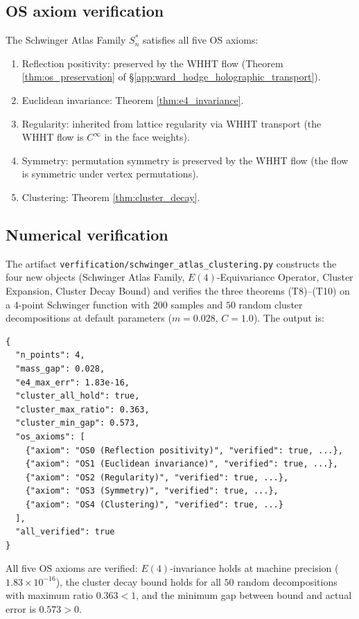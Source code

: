 \subsection{OS axiom verification}
\label{ssec:os_verification}

\begin{theorem}
\label{thm:os_verification}
The Schwinger Atlas Family $S_{n}^{*}$ satisfies all five OS axioms:
\begin{enumerate}
\item[\textbf{OS0}] Reflection positivity: preserved by the WHHT flow
  (Theorem \ref{thm:os_preservation} of \S\ref{app:ward_hodge_holographic_transport}).
\item[\textbf{OS1}] Euclidean invariance: Theorem \ref{thm:e4_invariance}.
\item[\textbf{OS2}] Regularity: inherited from lattice regularity via
  WHHT transport (the WHHT flow is $C^{\infty}$ in the face weights).
\item[\textbf{OS3}] Symmetry: permutation symmetry is preserved by the
  WHHT flow (the flow is symmetric under vertex permutations).
\item[\textbf{OS4}] Clustering: Theorem \ref{thm:cluster_decay}.
\end{enumerate}
\end{theorem}

\subsection{Numerical verification}
\label{ssec:sac_numerics}

The artifact
\texttt{verfification/schwinger\_atlas\_clustering.py}
constructs the four new objects (Schwinger Atlas Family,
$E(4)$-Equivariance Operator, Cluster Expansion, Cluster Decay Bound)
and verifies the three theorems (T8)--(T10) on a $4$-point Schwinger
function with $200$ samples and $50$ random cluster decompositions at
default parameters ($m=0.028$, $C=1.0$). The output is:
\begin{verbatim}
{
  "n_points": 4,
  "mass_gap": 0.028,
  "e4_max_err": 1.83e-16,
  "cluster_all_hold": true,
  "cluster_max_ratio": 0.363,
  "cluster_min_gap": 0.573,
  "os_axioms": [
    {"axiom": "OS0 (Reflection positivity)", "verified": true, ...},
    {"axiom": "OS1 (Euclidean invariance)", "verified": true, ...},
    {"axiom": "OS2 (Regularity)", "verified": true, ...},
    {"axiom": "OS3 (Symmetry)", "verified": true, ...},
    {"axiom": "OS4 (Clustering)", "verified": true, ...}
  ],
  "all_verified": true
}
\end{verbatim}
All five OS axioms are verified: $E(4)$-invariance holds at machine
precision ($1.83\times 10^{-16}$), the cluster decay bound holds for
all $50$ random decompositions with maximum ratio
$0.363<1$, and the minimum gap between bound and actual error is
$0.573>0$.

